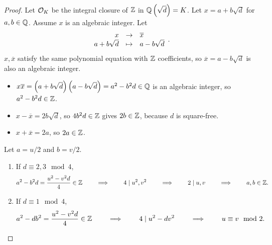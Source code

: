 \begin{proof}
Let $ \mathcal{O}_K $ be the integral closure of $ \mathbb{Z} $ in $ \mathbb{Q}\left( \sqrt{d} \right) = K $. Let $ x = a + b\sqrt{d} $ for $ a, b \in \mathbb{Q} $. Assume $ x $ is an algebraic integer. Let
$$ \function{x}{\overline{x}}{a + b\sqrt{d}}{a - b\sqrt{d}}. $$
$ x, \overline{x} $ satisfy the same polynomial equation with $ \mathbb{Z} $ coefficients, so $ \overline{x} = a - b\sqrt{d} $ is also an algebraic integer.
\begin{itemize}
\item $ x\overline{x} = \left( a + b\sqrt{d} \right)\left( a - b\sqrt{d} \right) = a^2 - b^2d \in \mathbb{Q} $ is an algebraic integer, so $ a^2 - b^2d \in \mathbb{Z} $.
\item $ x - \overline{x} = 2b\sqrt{d} $, so $ 4b^2d \in \mathbb{Z} $ gives $ 2b \in \mathbb{Z} $, because $ d $ is square-free.
\item $ x + \overline{x} = 2a $, so $ 2a \in \mathbb{Z} $.
\end{itemize}
Let $ a = u / 2 $ and $ b = v / 2 $.
\begin{enumerate}
\item If $ d \equiv 2, 3 \mod 4 $,
$$ a^2 - b^2d = \dfrac{u^2 - v^2d}{4} \in \mathbb{Z} \qquad \implies \qquad 4 \mid u^2, v^2 \qquad \implies \qquad 2 \mid u, v \qquad \implies \qquad a, b \in \mathbb{Z}. $$
\item If $ d \equiv 1 \mod 4 $,
$$ a^2 - db^2 = \dfrac{u^2 - v^2d}{4} \in \mathbb{Z} \qquad \implies \qquad 4 \mid u^2 - dv^2 \qquad \implies \qquad u \equiv v \mod 2. $$
\end{enumerate}

\end{proof}


